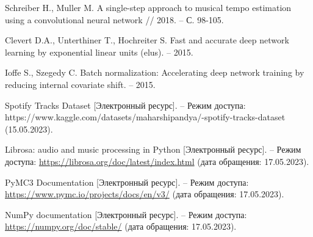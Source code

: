 \begin{thebibliography}{}
Schreiber H., Muller M. A single-step approach to musical tempo estimation using a convolutional neural network // 2018. -- С. 98-105.

Clevert D.A., Unterthiner T., Hochreiter S. Fast and accurate deep network learning by exponential linear units (elus). -- 2015.

Ioffe S., Szegedy C. Batch normalization: Accelerating deep network training by reducing internal covariate shift. -- 2015.

Spotify Tracks Dataset [Электронный ресурс]. -- Режим доступа: https://www.kaggle.com/datasets/maharshipandya/-spotify-tracks-dataset (15.05.2023).

Librosa: audio and music processing in Python [Электронный ресурс]. -- Режим доступа: \url{https://librosa.org/doc/latest/index.html} (дата обращения: 17.05.2023).

PyMC3 Documentation [Электронный ресурс]. -- Режим доступа: \url{https://www.pymc.io/projects/docs/en/v3/} (дата обращения: 17.05.2023).

NumPy documentation [Электронный ресурс]. -- Режим доступа: \url{https://numpy.org/doc/stable/} (дата обращения: 17.05.2023).

\end{thebibliography}
\endgroup
